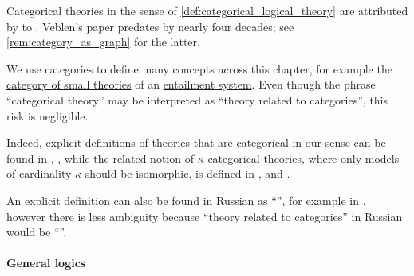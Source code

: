 \begin{remark}\label{rem:categorical_theory_terminology}
  Categorical theories in the sense of \cref{def:categorical_logical_theory} are attributed by \textcite[174]{Tarski1983Collection:ConceptOfTruth} to \textcite[346]{Veblen1904AxiomsForGeometry}. Veblen's paper predates  by nearly four decades; see \cref{rem:category_as_graph} for the latter.

  We use categories to define many concepts across this chapter, for example the \hyperref[def:category_of_theories]{category of small theories} of an \hyperref[def:entailment_system]{entailment system}. Even though the phrase \enquote{categorical theory} may be interpreted as \enquote{theory related to categories}, this risk is negligible.

  Indeed, explicit definitions of theories that are categorical in our sense can be found in
  \cite[def. 2.5.2(i)]{Hinman2005Logic},
  \cite[88]{Shoenfield1967MathematicalLogic},
  while the related notion of \( \kappa \)-categorical theories, where only models of cardinality \( \kappa \) should be isomorphic, is defined in
  \cite[def. 3.3.15]{VanDalen2004LogicAndStructure},
  \cite[exerc. X5502]{Andrews2002Logic} and
  \cite[def. 2.3.3]{TentZiegler2012ModelTheory}.

  An explicit definition can also be found in Russian as \enquote{}, for example in \cite[249]{Мальцев1970АлгебраическиеСистемы}, however there is less ambiguity because \enquote{theory related to categories} in Russian would be \enquote{}.
\end{remark}

\paragraph{General logics}

